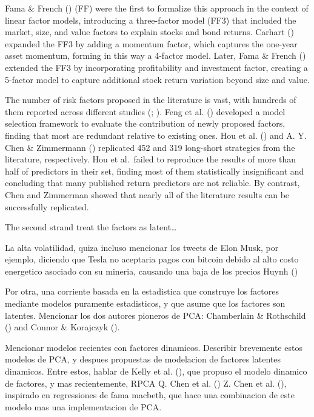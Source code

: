 \documentclass[
  12pt,
  a4paper,
  openany]{scrbook}
\begin{document}
Fama \& French () (FF) were the
first to formalize this approach in the context of linear factor models,
introducing a three-factor model (FF3) that included the market, size,
and value factors to explain stocks and bond returns. Carhart
() expanded the FF3 by
adding a momentum factor, which captures the one-year asset momentum,
forming in this way a 4-factor model. Later, Fama \& French
() extended the FF3 by
incorporating profitability and investment factor, creating a 5-factor
model to capture additional stock return variation beyond size and
value.

The number of risk factors proposed in the literature is vast, with
hundreds of them reported across different studies
(;
). Feng et al.
() developed a model selection
framework to evaluate the contribution of newly proposed factors,
finding that most are redundant relative to existing ones. Hou et al.
() and A. Y. Chen \&
Zimmermann () replicated 452 and
319 long-short strategies from the literature, respectively. Hou et
al.~failed to reproduce the results of more than half of predictors in
their set, finding most of them statistically insignificant and
concluding that many published return predictors are not reliable. By
contrast, Chen and Zimmerman showed that nearly all of the literature
results can be successfully replicated.

The second strand treat the factors as latent\ldots{}

La alta volatilidad, quiza incluso mencionar los tweets de Elon Musk,
por ejemplo, diciendo que Tesla no aceptaria pagos con bitcoin debido al
alto costo energetico asociado con su mineria, causando una baja de los
precios Huynh ()

Por otra, una corriente basada en la estadistica que construye los
factores mediante modelos puramente estadisticos, y que asume que los
factores son latentes. Mencionar los dos autores pioneros de PCA:
Chamberlain \& Rothschild
() and Connor \&
Korajczyk ().

Mencionar modelos recientes con factores dinamicos. Describir brevemente
estos modelos de PCA, y despues propuestas de modelacion de factores
latentes dinamicos. Entre estos, hablar de Kelly et al.
(), que propuso el
modelo dinamico de factores, y mas recientemente, RPCA Q. Chen et al.
() Z. Chen et al.
(), inspirado en regressiones de
fama macbeth, que hace una combinacion de este modelo mas una
implementacion de PCA.
\end{document}
